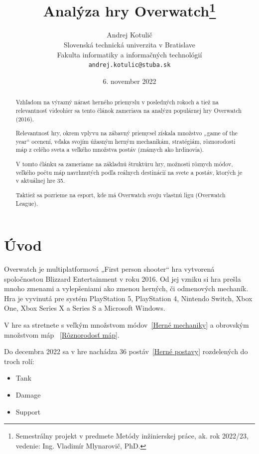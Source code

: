 \documentclass[10pt,oneside,slovak,a4paper]{article}
\title{Analýza hry Overwatch\thanks{Semestrálny projekt v predmete Metódy inžinierskej práce, ak. rok 2022/23, vedenie: Ing. Vladimír Mlynarovič, PhD.}} %
\author{Andrej Kotulič\\[2pt]
	{\small Slovenská technická univerzita v Bratislave}\\
	{\small Fakulta informatiky a informačných technológií}\\
	{\small \texttt{andrej.kotulic@stuba.sk}}
	}
\date{\small 6. november 2022} %
\begin{document}
\maketitle

\begin{abstract}
Vzhľadom na výrazný nárast herného priemyslu v posledných rokoch a tiež na relevantnosť videohier sa tento článok zameriava na analýzu populárnej hry Overwatch (2016). 

Relevantnosť hry, okrem vplyvu na zábavný priemysel získala množstvo „game of the year“ ocenení, vďaka svojím úžasným herným mechanikám, stratégiám, rôznorodosti máp z celého sveta a veľkého množstva postáv (známych ako hrdinovia).

V tomto článku sa zameriame na základnú štruktúru hry, možnosti rôznych módov, veľkého počtu máp navrhnutých podľa reálnych destinácií na svete a postáv, ktorých je v aktuálnej hre 35. 

Taktiež sa pozrieme na esport, kde má Overwatch svoju vlastnú ligu (Overwatch League).
\end{abstract}



\section{Úvod}

Overwatch je multiplatformová „First person shooter“ hra vytvorená spoločnostou Blizzard Entertainment  v roku 2016.
Od jej vzniku si hra prešla mnoho zmenami a vylepšeniami ako zmenou herných, či odmenových mechaník.
Hra je vyvinutá pre systém PlayStation 5, PlayStation 4, Nintendo Switch, Xbox One, Xbox Series X a Series S a Microsoft Windows.

V hre sa stretnete s veľkým množstvom módov~\ref{Herné mechaniky} a obrovským množstvom máp ~\ref{Rôznorodosť máp}.

Do decembra 2022 sa v hre nachádza 36 postáv~\ref{Herné postavy} rozdelených do troch rolí:
\begin{itemize}
\item Tank
\item Damage
\item Support
\end{itemize}
\end{document}
